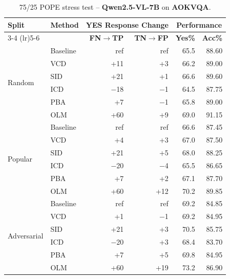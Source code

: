 \documentclass[11pt]{article}
\begin{document}

\begin{table}[ht]
\centering
\caption{75/25 POPE stress test -- \textbf{Qwen2.5-VL-7B} on \textbf{AOKVQA}.}
\label{tab:75_25_qwen_aokvqa}
\setlength{\tabcolsep}{6pt}
\renewcommand{\arraystretch}{1.1}
\begin{tabular}{l|l|rr|rr}
\toprule
\multirow{2}{*}{\textbf{Split}} &
\multirow{2}{*}{\textbf{Method}} &
\multicolumn{2}{c|}{\textbf{YES Response Change}} &
\multicolumn{2}{c}{\textbf{Performance}} \\
\cmidrule(lr){3-4} \cmidrule(lr){5-6}
& & \textbf{FN$\to$TP} & \textbf{TN$\to$FP} & \textbf{Yes\%} & \textbf{Acc\%} \\
\midrule

\multirow{6}{*}{Random}
& Baseline & ref    & ref   & 65.5 & 88.60 \\
& VCD      & +11    & +3    & 66.2 & 89.00 \\
& SID      & +21    & +1    & 66.6 & 89.60 \\
& ICD      & $-$18  & $-$1  & 64.5 & 87.75 \\
& PBA      & +7     & $-$1  & 65.8 & 89.00 \\
& OLM      & +60    & +9    & 69.0 & 91.15 \\
\midrule

\multirow{6}{*}{Popular}
& Baseline & ref    & ref   & 66.6 & 87.45 \\
& VCD      & +4     & +3    & 67.0 & 87.50 \\
& SID      & +21    & +5    & 68.0 & 88.25 \\
& ICD      & $-$20  & $-$4  & 65.5 & 86.65 \\
& PBA      & +7     & +2    & 67.1 & 87.70 \\
& OLM      & +60    & +12   & 70.2 & 89.85 \\
\midrule

\multirow{6}{*}{Adversarial}
& Baseline & ref    & ref   & 69.2 & 84.85 \\
& VCD      & +1     & $-$1  & 69.2 & 84.95 \\
& SID      & +21    & +3    & 70.5 & 85.75 \\
& ICD      & $-$20  & +3    & 68.4 & 83.70 \\
& PBA      & +7     & +5    & 69.8 & 84.95 \\
& OLM      & +60    & +19   & 73.2 & 86.90 \\
\bottomrule
\end{tabular}
\end{table}
\end{document}
